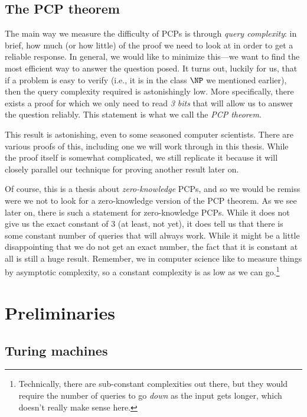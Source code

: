 \documentclass[english,12pt]{reedthesis}
\theoremstyle{plain}
\theoremstyle{definition}
\theoremstyle{remark}
\begin{document}
\section{The PCP theorem}

The main way we measure the difficulty of PCPs is through \emph{query
  complexity}: in brief, how much (or how little) of the proof we need to look at
in order to get a reliable response. In general, we would like to minimize
this---we want to find the most efficient way to answer the question posed. It
turns out, luckily for us, that if a problem is easy to verify (i.e., it is in
the class $\NP$ we mentioned earlier), then the query complexity required is
astonishingly low. More specifically, there exists a proof for which we only
need to read \emph{3 bits} that will allow us to answer the question reliably.
This statement is what we call the \emph{PCP theorem}.

This result is astonishing, even to some seasoned computer scientists. There are
various proofs of this, including one we will work through in this thesis. While
the proof itself is somewhat complicated, we still replicate it because it will
closely parallel our technique for proving another result later on.

Of course, this is a thesis about \emph{zero-knowledge} PCPs, and so we would be
remiss were we not to look for a zero-knowledge version of the PCP theorem. As
we see later on, there is such a statement for zero-knowledge PCPs. While it
does not give us the exact constant of 3 (at least, not yet), it does tell us
that there is some constant number of queries that will always work. While it
might be a little disappointing that we do not get an exact number, the fact
that it is constant at all is still a huge result. Remember, we in computer
science like to measure things by asymptotic complexity, so a constant
complexity is as low as we can go.\footnote{Technically, there are sub-constant
  complexities out there, but they would require the number of queries to go
  \emph{down} as the input gets longer, which doesn't really make sense here.}

\chapter{Preliminaries}

\section{Turing machines}
\end{document}
